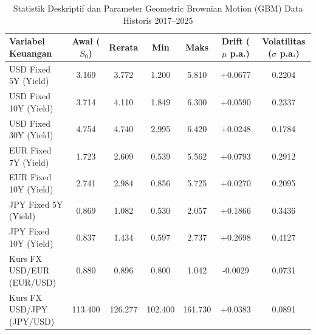 \begin{table}[htbp]
\centering
\caption{Statistik Deskriptif dan Parameter Geometric Brownian Motion (GBM) Data Historis 2017--2025}
\label{tab:market_stats}
\small
\begin{tabular}{lcccccc}
\toprule
\textbf{Variabel Keuangan} & \textbf{Awal ($S_0$)} & \textbf{Rerata} & \textbf{Min} & \textbf{Maks} & \textbf{Drift ($\mu$ p.a.)} & \textbf{Volatilitas ($\sigma$ p.a.)} \\
\midrule
USD Fixed 5Y (Yield) & 3.169 & 3.772 & 1.200 & 5.810 & +0.0677 & 0.2204 \\
USD Fixed 10Y (Yield) & 3.714 & 4.110 & 1.849 & 6.300 & +0.0590 & 0.2337 \\
USD Fixed 30Y (Yield) & 4.754 & 4.740 & 2.995 & 6.420 & +0.0248 & 0.1784 \\
EUR Fixed 7Y (Yield) & 1.723 & 2.609 & 0.539 & 5.562 & +0.0793 & 0.2912 \\
EUR Fixed 10Y (Yield) & 2.741 & 2.984 & 0.856 & 5.725 & +0.0270 & 0.2095 \\
JPY Fixed 5Y (Yield) & 0.869 & 1.082 & 0.530 & 2.057 & +0.1866 & 0.3436 \\
JPY Fixed 10Y (Yield) & 0.837 & 1.434 & 0.597 & 2.737 & +0.2698 & 0.4127 \\
Kurs FX USD/EUR (EUR/USD) & 0.880 & 0.896 & 0.800 & 1.042 & -0.0029 & 0.0731 \\
Kurs FX USD/JPY (JPY/USD) & 113.400 & 126.277 & 102.400 & 161.730 & +0.0383 & 0.0891 \\
\bottomrule
\end{tabular}
\end{table}